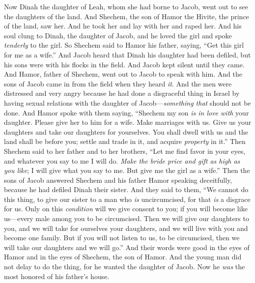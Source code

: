 \begin{biblechapter} %
 Now Dinah the daughter of Leah, whom she had borne to Jacob, went out to see the daughters of the land.
\verse And Shechem, the son of Hamor the Hivite, the prince of the land, saw her. And he took her and lay with her and raped her.
\verse And his soul clung to Dinah, the daughter of Jacob, and he loved the girl and spoke \textit{tenderly} to the girl.
\verse So Shechem said to Hamor his father, saying, “Get this girl for me as a wife.”
\verse And Jacob heard that Dinah his daughter had been defiled, but his sons were with his flocks in the field. And Jacob kept silent until they came.
\verse And Hamor, father of Shechem, went out to Jacob to speak with him.
\verse And the sons of Jacob came in from the field when they heard \textit{it}. And the men were distressed and very angry because he had done a disgraceful thing in Israel by having sexual relations with the daughter of Jacob—\textit{something that} should not be done.
\verse And Hamor spoke with them saying, “Shechem my son \textit{is in love with} your daughter. Please give her to him for a wife.
\verse Make marriages with us. Give us your daughters and take our daughters for yourselves.
\verse You shall dwell with us and the land shall be before you; settle and trade in it, and acquire \textit{property} in it.”
\verse Then Shechem said to her father and to her brothers, “Let me find favor in your eyes, and whatever you say to me I will do.
\verse \textit{Make the bride price and gift as high as you like}; I will give what you say to me. But give me the girl as a wife.”
\verse Then the sons of Jacob answered Shechem and his father Hamor speaking deceitfully, because he had defiled Dinah their sister.
\verse And they said to them, “We cannot do this thing, to give our sister to a man who \textit{is} uncircumcised, for that \textit{is} a disgrace for us.
\verse Only on this \textit{condition} will we give consent to you; if you will become like us—every male among you to be circumcised.
\verse Then we will give our daughters to you, and we will take for ourselves your daughters, and we will live with you and become one family.
\verse But if you will not listen to us, to be circumcised, then we will take our daughters and we will go.”
\verse And their words were good in the eyes of Hamor and in the eyes of Shechem, the son of Hamor.
\verse And the young man did not delay to do the thing, for he wanted the daughter of Jacob. Now he \textit{was} the most honored of his father’s house.

\end{biblechapter}
